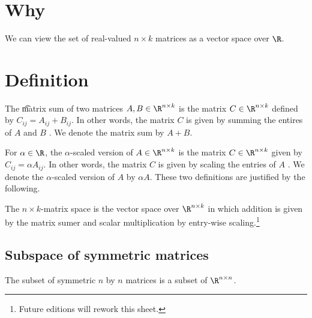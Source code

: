 

\section*{Why}

We can view the set of real-valued $n \times k$ matrices as a vector space over $\R $.

\section*{Definition}

The \t{matrix sum} of two matrices $A, B \in \R ^{n \times k}$ is the matrix $C \in \R ^{n \times k}$ defined by $C_{ij} = A_{ij} + B_{ij}$.
In other words, the matrix $C$ is given by summing the entires of $A$ and $B$ .
We denote the matrix sum by $A + B$.

For $\alpha  \in \R $, the \t{$\alpha $-scaled version} of $A \in \R ^{n \times k}$ is the matrix $C \in \R ^{n \times k}$ given by $C_{ij} = \alpha  A_{ij}$.
In other words, the matrix $C$ is given by scaling the entries of $A$ .
We denote the $\alpha $-scaled version of $A$ by $\alpha  A$.
These two definitions are justified by the following.

The \t{$n \times k$-matrix space} is the vector space over $\R ^{n \times  k}$ in which addition is given by the matrix sumer and scalar multiplication by entry-wise scaling.\footnote{Future editions will rework this sheet.}

\subsection*{Subspace of symmetric matrices}

The subset of symmetric $n$ by $n$ matrices is a subset of $\R ^{n \times n}$.

\blankpage

